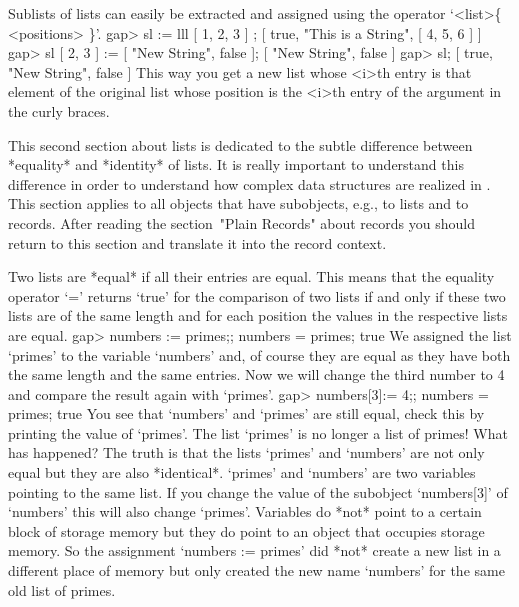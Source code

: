 Sublists of lists can easily be extracted and assigned using the operator
`<list>\{ <positions> \}'.
\beginexample
gap> sl := lll{ [ 1, 2, 3 ] };
[ true, "This is a String", [ 4, 5, 6 ] ]
gap> sl{ [ 2, 3 ] } := [ "New String", false ];
[ "New String", false ]
gap> sl;
[ true, "New String", false ]
\endexample
This way you get a new list whose <i>th entry is that element of the
original list whose position is the <i>th entry of the argument in the
curly braces.


This second  section  about lists is dedicated  to  the subtle difference
between  *equality*  and *identity*  of lists. It is really important to
understand   this  difference in  order   to  understand how complex data
structures are  realized in {\GAP}.   This section applies  to all {\GAP}
objects  that have  subobjects,  e.g.,  to lists   and to  records. After
reading the section~"Plain Records" about records you should return to
this section and translate it into the record context.

Two  lists are *equal* if all their entries are equal.  This means that the
equality operator `=' returns `true' for the  comparison of  two lists if
and  only if these two lists are of the same length and for each position
the values in the respective lists are equal.
\beginexample
gap> numbers := primes;; numbers = primes;
true
\endexample
We assigned  the  list `primes' to the variable  `numbers' and, of course
they are equal as they have  both  the same length  and the same entries.
Now we  will change the  third number to  4 and  compare the result again
with `primes'.
\beginexample
gap> numbers[3]:= 4;; numbers = primes;
true
\endexample
You  see that  `numbers' and  `primes'  are still   equal, check this  by
printing the value of `primes'. The list `primes' is  no longer a list of
primes! What has  happened?  The truth is  that  the  lists  `primes' and
`numbers' are  not only equal but they are also *identical*. `primes' and
`numbers' are two variables pointing to the  same list. If you change the
value of  the subobject `numbers[3]'  of `numbers' this will  also change
`primes'.  Variables do *not* point to  a certain block of storage memory
but they do  point  to an object that  occupies  storage memory.   So the
assignment `numbers := primes' did *not* create a new list in a different
place of memory but only created the new name `numbers'  for the same old
list of primes.

